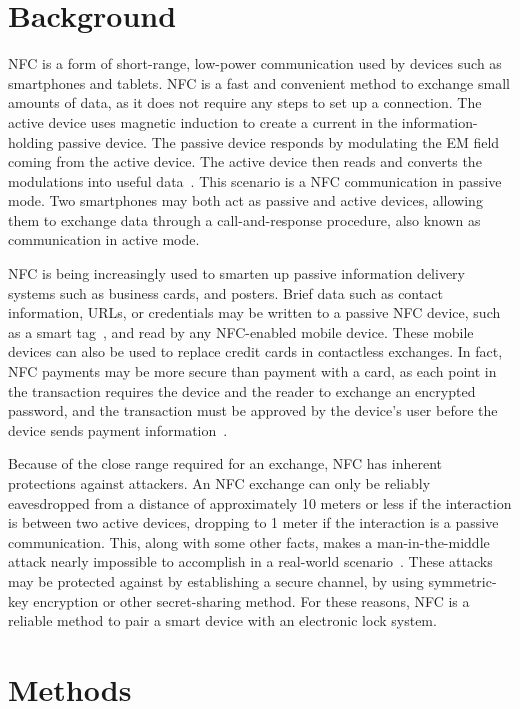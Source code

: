 \documentclass{article}
\begin{document}
\section{Background}

NFC is a form of short-range, low-power communication used by devices such as smartphones and tablets. NFC is a fast
and convenient method to exchange small amounts of data, as it does not require any steps to set up a connection. The active
device uses magnetic induction to create a current in the information-holding passive device. The
passive device responds by modulating the EM field coming from the active device. The active device then reads and
converts the modulations into useful data~\autocite{NFCORG}. This scenario is a NFC communication in passive mode. Two
smartphones may both act as passive and active devices, allowing them to exchange data through a call-and-response procedure,
also known as communication in active mode.

NFC is being increasingly used to smarten up passive information delivery systems such as business cards, and posters.
Brief data such as contact information, URLs, or credentials may be written to a passive NFC device, such as a smart
tag~\autocite{NFCFORUMWHATIS}, and read by any NFC-enabled mobile device. These mobile devices can also be used to
replace credit cards in contactless exchanges. In fact, NFC payments may be more secure than payment with a card, as
each point in the transaction requires the device and the reader to exchange an encrypted password, and the transaction
 must be approved by the device's user before the device sends payment information~\autocite{NFCPAYMENT}.

Because of the close range required for an exchange, NFC has inherent protections against attackers. An NFC exchange
can only be reliably eavesdropped from a distance of approximately 10 meters or less if the interaction is between two 
active devices, dropping to 1 meter if the interaction is a passive communication. This, along with some other facts, 
makes a man-in-the-middle attack nearly impossible to accomplish in a real-world scenario~\autocite{NFCSECURITY}. These 
attacks may be protected against by establishing a secure channel, by using symmetric-key encryption or other 
secret-sharing method. For these reasons, NFC is a reliable method to pair a smart device with an electronic lock 
system.

\section{Methods}
\end{document}
